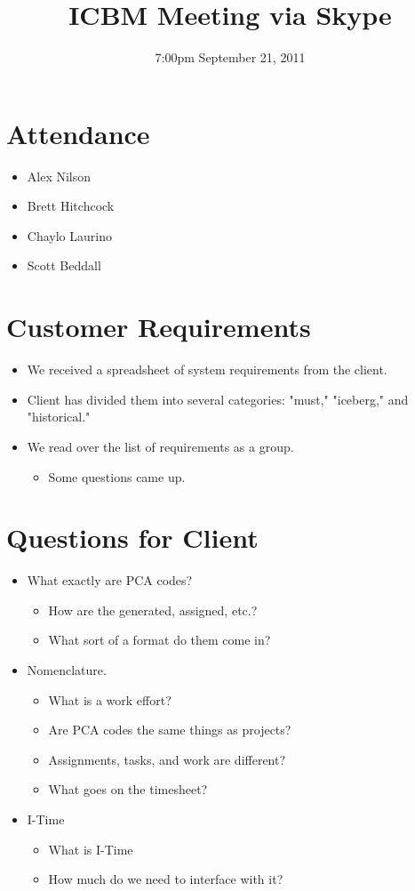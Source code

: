 \documentclass{article}
\begin{document}
\title{ICBM Meeting via Skype}
\date{7:00pm September 21, 2011}
\maketitle

\section{Attendance}
\begin{itemize}
\item Alex Nilson
\item Brett Hitchcock
\item Chaylo Laurino
\item Scott Beddall
\end{itemize}

\section{Customer Requirements}
\begin{itemize}
\item We received a spreadsheet of system requirements from the client.
\item Client has divided them into several categories: "must," "iceberg," and "historical."
\item We read over the list of requirements as a group.
	\begin{itemize}
	\item Some questions came up.
	\end{itemize}
\end{itemize}


\section{Questions for Client}
\begin{itemize}
\item What exactly are PCA codes? 
	\begin{itemize}
	\item How are the generated, assigned, etc.?
	\item What sort of a format do them come in?
	\end{itemize}
\item Nomenclature.
	\begin{itemize}
	\item What is a work effort?
	\item Are PCA codes the same things as projects?
	\item Assignments, tasks, and work are different?
	\item What goes on the timesheet?
	\end{itemize}
\item I-Time
	\begin{itemize}
	\item What is I-Time
	\item How much do we need to interface with it?
	\end{itemize}
\end{itemize}
\end{document}
